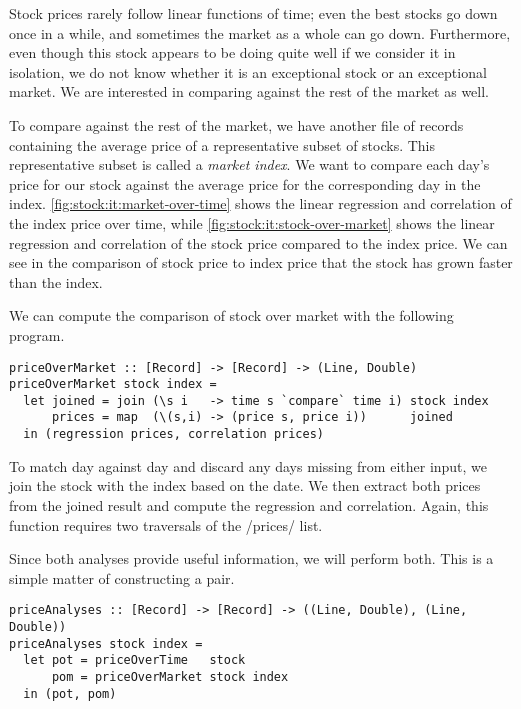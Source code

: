 Stock prices rarely follow linear functions of time; even the best stocks go down once in a while, and sometimes the market as a whole can go down.
Furthermore, even though this stock appears to be doing quite well if we consider it in isolation, we do not know whether it is an exceptional stock or an exceptional market.
We are interested in comparing against the rest of the market as well.

To compare against the rest of the market, we have another file of records containing the average price of a representative subset of stocks.
This representative subset is called a \emph{market index}.
We want to compare each day's price for our stock against the average price for the corresponding day in the index.
\autoref{fig:stock:it:market-over-time} shows the linear regression and correlation of the index price over time, while \autoref{fig:stock:it:stock-over-market} shows the linear regression and correlation of the stock price compared to the index price.
We can see in the comparison of stock price to index price that the stock has grown faster than the index.

We can compute the comparison of stock over market with the following program.

\begin{lstlisting}
priceOverMarket :: [Record] -> [Record] -> (Line, Double)
priceOverMarket stock index =
  let joined = join (\s i   -> time s `compare` time i) stock index
      prices = map  (\(s,i) -> (price s, price i))      joined
  in (regression prices, correlation prices)
\end{lstlisting}

To match day against day and discard any days missing from either input, we join the stock with the index based on the date.
We then extract both prices from the joined result and compute the regression and correlation.
Again, this function requires two traversals of the \Hs/prices/ list.

Since both analyses provide useful information, we will perform both.
This is a simple matter of constructing a pair.

\begin{lstlisting}
priceAnalyses :: [Record] -> [Record] -> ((Line, Double), (Line, Double))
priceAnalyses stock index =
  let pot = priceOverTime   stock
      pom = priceOverMarket stock index
  in (pot, pom)
\end{lstlisting}

